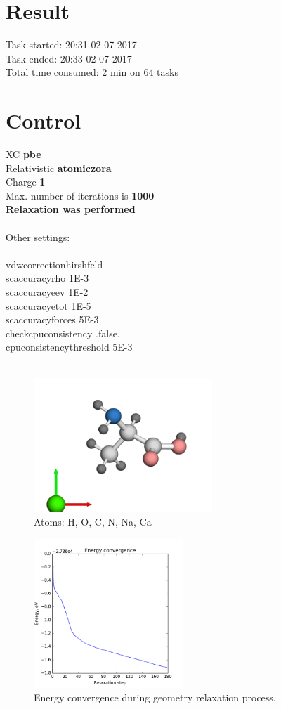 \documentclass[12pt,a4paper,twocolumn]{report}
\begin{document}
\section*{Result}
Task started: \hfill 20:31 02-07-2017
\\
Task ended: \hfill 20:33 02-07-2017
\\
Total time consumed: 2 min on 64 tasks\\
\section*{Control}
XC  \hfill \textbf{pbe}\\
Relativistic  \hfill \textbf{atomic\textunderscore zora}\\
Charge  \hfill \textbf{1}\\
Max. number of iterations is \hfill \textbf{1000}\\
\textbf{Relaxation was performed\\}
\\
Other settings:\\
\\
vdw\textunderscore correction\textunderscore hirshfeld\\
sc\textunderscore accuracy\textunderscore rho    1E-3\\
sc\textunderscore accuracy\textunderscore eev    1E-2\\
sc\textunderscore accuracy\textunderscore etot   1E-5\\
sc\textunderscore accuracy\textunderscore forces 5E-3\\
check\textunderscore cpu\textunderscore consistency .false.\\
cpu\textunderscore consistency\textunderscore threshold 5E-3\\
\\
\newpage
\begin{figure}[h!]
\caption{Atoms: H, O, C, N, Na, Ca } 
\includegraphics[width=0.6\textwidth]{geometry.png}
\end{figure}
\begin{figure}[H]
\caption{Energy convergence during geometry relaxation process.} 
\includegraphics[width=0.5\textwidth]{energy_convergence.png}
\end{figure}
\end{document}
